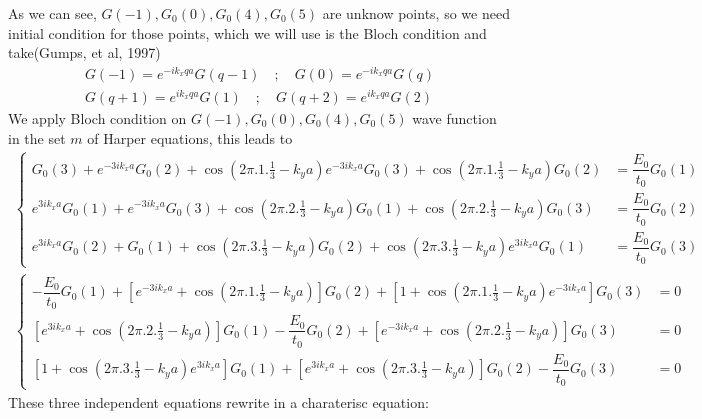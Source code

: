 \documentclass{report}
\newcommand{\f}[2]{\dfrac{#1}{#2}}
\begin{document}
As we can see, $G(-1),G_{0}(0),G_{0}(4),G_{0}(5)$ are unknow points, so we need initial condition for those points, which we will use is the Bloch condition and take(Gumps, et al, 1997)
\begin{align*}
	G(-1) = e^{-i k_x q a} G(q-1) \quad ; \quad G(0) = e^{-i k_x q a} G(q) \\
	G(q+1) = e^{i k_x q a} G(1) \quad ; \quad G(q+2) = e^{i k_x q a} G(2)
\end{align*}
We apply Bloch condition on $G(-1),G_{0}(0),G_{0}(4),G_{0}(5)$ wave function in the set $m$ of Harper equations, this leads to
\begin{align*}
	\begin{cases}
		G_{0}(3) + e^{-3i k_x a} G_{0}(2) + \cos\left( 2\pi.1.\frac{1}{3} - k_ya \right) e^{-3i k_x a} G_{0}(3) + \cos\left( 2\pi.1.\frac{1}{3} - k_ya \right) G_{0}(2)
		 & =\f{E_{0}}{t_0} G_{0}(1) \\
		e^{3i k_x a} G_{0}(1) + e^{-3i k_x a} G_{0}(3) + \cos\left( 2\pi.2.\frac{1}{3} - k_ya \right) G_{0}(1) + \cos\left( 2\pi.2.\frac{1}{3} - k_ya \right) G_{0}(3)
		 & =\f{E_{0}}{t_0} G_{0}(2) \\
		e^{3i k_x a} G_{0}(2) + G_{0}(1) + \cos\left( 2\pi.3.\frac{1}{3} - k_ya \right) G_{0}(2) + \cos\left( 2\pi.3.\frac{1}{3} - k_ya \right) e^{3i k_x a} G_{0}(1)
		 & =\f{E_{0}}{t_0} G_{0}(3)
	\end{cases}
\end{align*}
\begin{align*}
	\begin{cases}
		-\f{E_{0}}{t_0} G_{0}(1) + \left[e^{-3i k_x a} + \cos\left( 2\pi.1.\frac{1}{3} - k_ya \right)\right] G_{0}(2) + \left[1 + \cos\left( 2\pi.1.\frac{1}{3} - k_ya \right) e^{-3i k_x a}\right] G_{0}(3)
		 & = 0 \\
		\left[e^{3i k_x a} + \cos\left( 2\pi.2.\frac{1}{3} - k_ya \right) \right] G_{0}(1) - \f{E_{0}}{t_0} G_{0}(2) + \left[e^{-3i k_x a} + \cos\left( 2\pi.2.\frac{1}{3} - k_ya \right)\right] G_{0}(3)
		 & = 0 \\
		\left[1 + \cos\left( 2\pi.3.\frac{1}{3} - k_ya \right) e^{3i k_x a}\right] G_{0}(1) + \left[e^{3i k_x a} + \cos\left( 2\pi.3.\frac{1}{3} - k_ya \right)\right] G_{0}(2) - \f{E_{0}}{t_0} G_{0}(3)
		 & = 0
	\end{cases}
\end{align*}
These three independent equations rewrite in a charaterisc equation:
\end{document}
